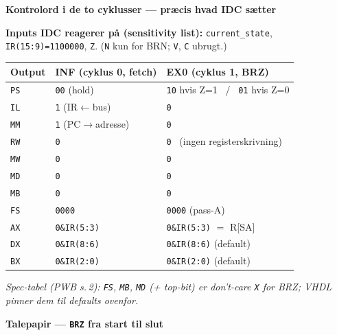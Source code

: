 \documentclass[11pt,a4paper]{article}
\newcommand{\sect}[1]{\vspace{0.35em}\textcolor{accent}{\large\bfseries #1}\par\vspace{0.1em}}
\begin{document}
\sect{Kontrolord i de to cyklusser --- præcis hvad IDC sætter}

\textbf{Inputs IDC reagerer på (sensitivity list):} \texttt{current\_state}, \texttt{IR(15:9)=1100000}, \texttt{Z}.
\;(\texttt{N} kun for BRN; \texttt{V}, \texttt{C} ubrugt.)

\begin{center}
\small
\begin{tabular}{@{}l l l@{}}
\hline
\textbf{Output} & \textbf{INF (cyklus 0, fetch)} & \textbf{EX0 (cyklus 1, BRZ)} \\
\hline
\texttt{PS} & \texttt{00} (hold)        & \texttt{10} hvis Z=1 \ / \ \texttt{01} hvis Z=0 \\
\texttt{IL} & \texttt{1} (IR$\leftarrow$bus) & \texttt{0} \\
\texttt{MM} & \texttt{1} (PC$\to$adresse) & \texttt{0} \\
\texttt{RW} & \texttt{0}                & \texttt{0} \ (ingen registerskrivning) \\
\texttt{MW} & \texttt{0}                & \texttt{0} \\
\texttt{MD} & \texttt{0}                & \texttt{0} \\
\texttt{MB} & \texttt{0}                & \texttt{0} \\
\texttt{FS} & \texttt{0000}             & \texttt{0000} (pass-A) \\
\texttt{AX} & \texttt{0\&IR(5:3)}       & \texttt{0\&IR(5:3)} $=$ R[SA] \\
\texttt{DX} & \texttt{0\&IR(8:6)}       & \texttt{0\&IR(8:6)} (default) \\
\texttt{BX} & \texttt{0\&IR(2:0)}       & \texttt{0\&IR(2:0)} (default) \\
\hline
\end{tabular}
\end{center}

{\footnotesize\textit{Spec-tabel (PWB s.\,2): \texttt{FS}, \texttt{MB}, \texttt{MD} (+ top-bit) er don't-care \texttt{X} for BRZ; VHDL pinner dem til defaults ovenfor.}}


\newpage
\thispagestyle{empty}
\null
\newpage
\sect{Talepapir --- \texttt{BRZ} fra start til slut}
\end{document}
